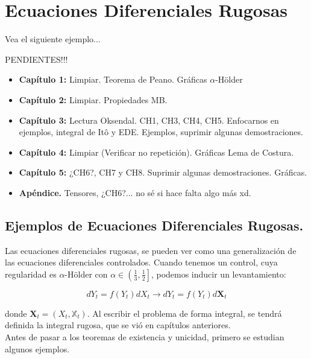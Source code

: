 \chapter{Ecuaciones Diferenciales Rugosas}

Vea el siguiente ejemplo...

PENDIENTES!!!

\begin{itemize}
	\item  \textbf{Capítulo 1:} Limpiar. Teorema de Peano. Gráficas $\alpha$-Hölder
	\item \textbf{Capítulo 2:} Limpiar. Propiedades MB.
	\item \textbf{Capítulo 3:} Lectura Oksendal. CH1, CH3, CH4, CH5. Enfocarnos en ejemplos, integral de Itô y EDE. Ejemplos, suprimir algunas demostraciones.
	\item \textbf{Capítulo 4:} Limpiar (Verificar no repetición). Gráficas Lema de Costura.
	\item \textbf{Capítulo 5:} ¿CH6?, CH7 y CH8. Suprimir algunas demostraciones. Gráficas.  
	\item \textbf{Apéndice.} Tensores, ¿CH6?... no sé si hace falta algo más xd.
\end{itemize}



\section{Ejemplos de Ecuaciones Diferenciales Rugosas.}

Las ecuaciones diferenciales rugosas, se pueden ver como una generalización de las ecuaciones diferenciales controlados. Cuando tenemos un control, cuya regularidad es $\alpha$-Hölder con $\alpha \in \left( \frac{1}{3}, \frac{1}{2} \right]$, podemos inducir un levantamiento:

\[
	dY_t = f(Y_t) dX_t \rightarrow  dY_t = f(Y_t) d\mathbf{X}_t
\]

donde $\mathbf{X}_t = (X_t, \mathbb{X}_t)$. Al escribir el problema de forma integral, se tendrá definida la integral rugosa, que se vió en capítulos anteriores. \\

Antes de pasar a los teoremas de existencia y unicidad, primero se estudian algunos ejemplos.

